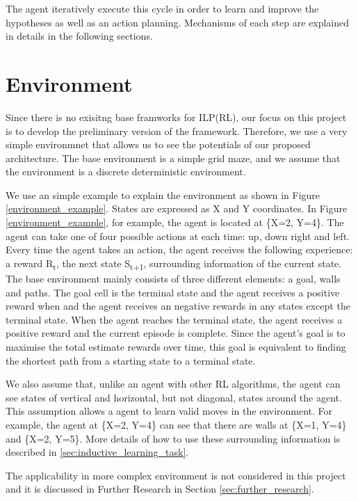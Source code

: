 The agent iteratively execute this cycle in order to learn and improve the hypotheses as well as an action planning. 
Mechanisms of each step are explained in details in the following sections.


\section{Environment}
\label{sec:environment}
Since there is no exisitng base framworks for ILP(RL), our focus on this project is to develop the preliminary version of the framework. 
Therefore, we use a very simple environmnet that allows us to see the potentials of our proposed architecture.
The base environment is a simple grid maze, and we assume that the environment is a discrete deterministic environment. 

We use an simple example to explain the environment as shown in Figure \ref{environment_example}.
States are expressed as X and Y coordinates. In Figure \ref{environment_example}, for example, the agent is located at \{X=2, Y=4\}.
The agent can take one of four possible actions at each time: up, down right and left.
Every time the agent takes an action, the agent receives the following experience: a reward R\textsubscript{t}, the next state S\textsubscript{t+1}, surrounding information of the current state.
The base environment mainly consists of three different elements: a goal, walls and paths.
The goal cell is the terminal state and the agent receives a positive reward when and the agent receives an negative rewards in any states except the terminal state.
When the agent reaches the terminal state, the agent receives a positive reward and the current episode is complete. 
Since the agent's goal is to maximise the total estimate rewards over time, this goal is equivalent to finding the shortest path from a starting state to a terminal state.

We also assume that, unlike an agent with other RL algorithms, the agent can see states of vertical and horizontal, but not diagonal, states around the agent. 
This assumption allows a agent to learn valid moves in the environment. For example, the agent at \{X=2, Y=4\} can see that there are walls at \{X=1, Y=4\} and \{X=2, Y=5\}.
More details of how to use these surrounding information is described in \ref{sec:inductive_learning_task}.

The applicability in more complex environment is not considered in this project and it is discussed in Further Research in Section \ref{sec:further_research}.


